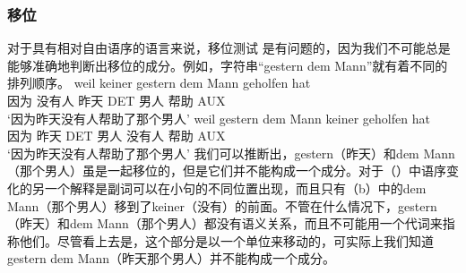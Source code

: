 \subsubsection{移位}
对于具有相对自由语序的语言来说，移位测试 是有问题的，因为我们不可能总是能够准确地判断出移位的成分。例如，字符串“gestern dem Mann”就有着不同的排列顺序。
\eal
\ex 
\gll weil keiner gestern dem Mann geholfen hat\\
     因为 没有人 昨天 DET 男人 帮助 AUX\\
\glt `因为昨天没有人帮助了那个男人'
\ex 
\gll weil gestern dem Mann keiner geholfen hat\\
	 因为 昨天 DET 男人 没有人 帮助 AUX\\
\glt `因为昨天没有人帮助了那个男人'
\zl
我们可以推断出，gestern（昨天）和dem Mann（那个男人）虽是一起移位的，但是它们并不能构成一个成分。对于（）中语序变化的另一个解释是副词可以在小句的不同位置出现，而且只有（b）中的dem Mann（那个男人）移到了keiner（没有）的前面。不管在什么情况下，gestern（昨天）和dem Mann（那个男人）都没有语义关系，而且不可能用一个代词来指称他们。尽管看上去是，这个部分是以一个单位来移动的，可实际上我们知道gestern dem Mann（昨天那个男人）并不能构成一个成分。

